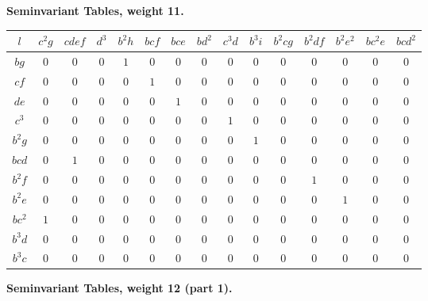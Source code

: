 \documentclass[11pt,a4paper]{book}
\begin{document}
\newpage
\textbf{Seminvariant Tables, weight 11.}

\begin{longtable}{|c|c|c|c|c|c|c|c|c|c|c|c|c|c|c|}
\hline
$l$ & $c^2g$ & $cdef$ & $d^3$ & $b^2h$ & $bcf$ & $bce$ & $bd^2$ & $c^3d$ & $b^3i$ & $b^2cg$ & $b^2df$ & $b^2e^2$ & $bc^2e$ & $bcd^2$\\
\hline
\endhead
$bg$ & $0$ & $0$ & $0$ & $1$ & $0$ & $0$ & $0$ & $0$ & $0$ & $0$ & $0$ & $0$ & $0$ & $0$\\
$cf$ & $0$ & $0$ & $0$ & $0$ & $1$ & $0$ & $0$ & $0$ & $0$ & $0$ & $0$ & $0$ & $0$ & $0$\\
$de$ & $0$ & $0$ & $0$ & $0$ & $0$ & $1$ & $0$ & $0$ & $0$ & $0$ & $0$ & $0$ & $0$ & $0$\\
$c^3$ & $0$ & $0$ & $0$ & $0$ & $0$ & $0$ & $0$ & $1$ & $0$ & $0$ & $0$ & $0$ & $0$ & $0$\\
$b^2g$ & $0$ & $0$ & $0$ & $0$ & $0$ & $0$ & $0$ & $0$ & $1$ & $0$ & $0$ & $0$ & $0$ & $0$\\
$bcd$ & $0$ & $1$ & $0$ & $0$ & $0$ & $0$ & $0$ & $0$ & $0$ & $0$ & $0$ & $0$ & $0$ & $0$\\
$b^2f$ & $0$ & $0$ & $0$ & $0$ & $0$ & $0$ & $0$ & $0$ & $0$ & $0$ & $1$ & $0$ & $0$ & $0$\\
$b^2e$ & $0$ & $0$ & $0$ & $0$ & $0$ & $0$ & $0$ & $0$ & $0$ & $0$ & $0$ & $1$ & $0$ & $0$\\
$bc^2$ & $1$ & $0$ & $0$ & $0$ & $0$ & $0$ & $0$ & $0$ & $0$ & $0$ & $0$ & $0$ & $0$ & $0$\\
$b^3d$ & $0$ & $0$ & $0$ & $0$ & $0$ & $0$ & $0$ & $0$ & $0$ & $0$ & $0$ & $0$ & $0$ & $0$\\
$b^3c$ & $0$ & $0$ & $0$ & $0$ & $0$ & $0$ & $0$ & $0$ & $0$ & $0$ & $0$ & $0$ & $0$ & $0$\\
\hline
\end{longtable}

\newpage
\textbf{Seminvariant Tables, weight 12 (part 1).}
\end{document}
